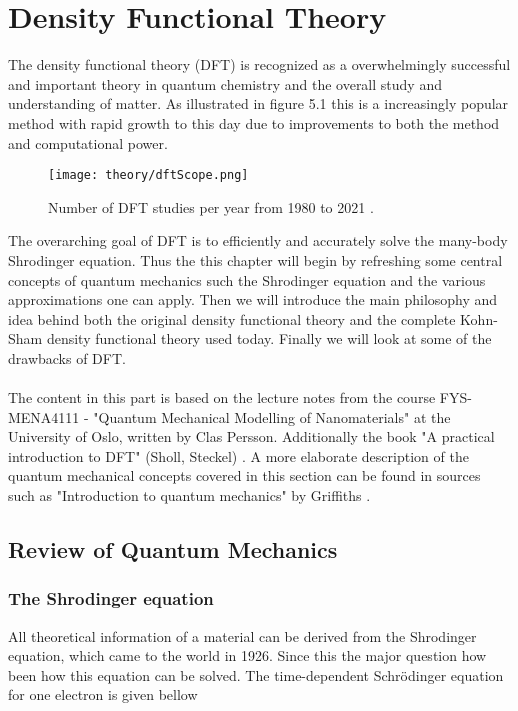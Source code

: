 \chapter{Density Functional Theory}
\label{sec:DFT}

The density functional theory (DFT) is recognized as a overwhelmingly successful and important theory in quantum chemistry and the overall study and understanding of matter. As illustrated in figure 5.1 this is a increasingly popular method with rapid growth to this day due to improvements to both the method and computational power.

\begin{figure}[H]
\texttt{[image: theory/dftScope.png]}
\caption{Number of DFT studies per year from 1980 to 2021 \cite{dimensions}.}
\end{figure}

The overarching goal of DFT is to efficiently and accurately solve the many-body Shrodinger equation. Thus the this chapter will begin by refreshing some central concepts of quantum mechanics such the Shrodinger equation and the various approximations one can apply. Then we will introduce the main philosophy and idea behind both the original density functional theory and the complete Kohn-Sham density functional theory used today. Finally we will look at some of the drawbacks of DFT. \\\\

The content in this part is based on the lecture notes \cite{persson2020} from the course FYS-MENA4111 - "Quantum Mechanical Modelling of Nanomaterials" at the University of Oslo, written by Clas Persson. Additionally the book "A practical introduction to DFT" (Sholl, Steckel) \cite{Sholl2009}. A more elaborate description of the quantum mechanical concepts covered in this section can be found in sources such as "Introduction to quantum mechanics" by Griffiths \cite{Griffiths2016}.

\section{Review of Quantum Mechanics}

\subsection{The Shrodinger equation}
All theoretical information of a material can be derived from the Shrodinger equation, which came to the world in 1926. Since this the major question how been how this equation can be solved. 
The time-dependent Schr\"{o}dinger equation for one electron is given bellow

